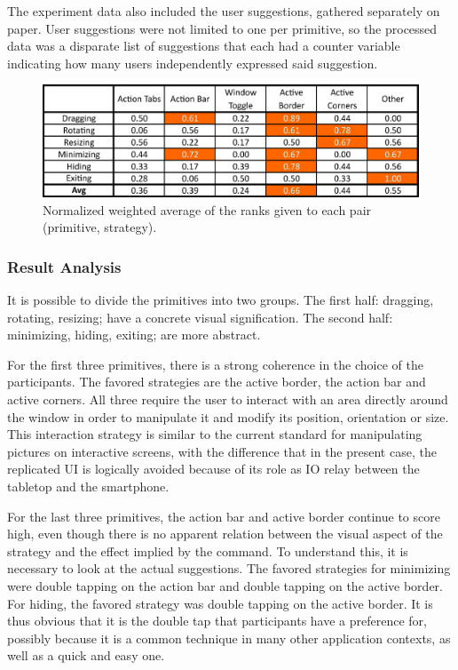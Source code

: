 The experiment data also included the user suggestions, gathered separately on paper.
User suggestions were not limited to one per primitive, so the processed data was a disparate list of suggestions that each had a counter variable indicating how many users independently expressed said suggestion.

\begin{figure}[htb]
  \centering
    \includegraphics[scale=1]{images/resultMatrix}
  \caption{Normalized weighted average of the ranks given to each pair (primitive, strategy).}
  \label{resultMatrix}
\end{figure}


\subsubsection{Result Analysis}

It is possible to divide the primitives into two groups.
The first half: dragging, rotating, resizing; have a concrete visual signification.
The second half: minimizing, hiding, exiting; are more abstract.

For the first three primitives, there is a strong coherence in the choice of the participants.
The favored strategies are the active border, the action bar and active corners.
All three require the user to interact with an area directly around the window in order to manipulate it and modify its position, orientation or size.
This interaction strategy is similar to the current standard for manipulating pictures on interactive screens, with the difference that in the present case, the replicated UI is logically avoided because of its role as IO relay between the tabletop and the smartphone.

For the last three primitives, the action bar and active border continue to score high, even though there is no apparent relation between the visual aspect of the strategy and the effect implied by the command.
To understand this, it is necessary to look at the actual suggestions.
The favored strategies for minimizing were double tapping on the action bar and double tapping on the active border.
For hiding, the favored strategy was double tapping on the active border.
It is thus obvious that it is the double tap that participants have a preference for, possibly because it is a common technique in many other application contexts, as well as a quick and easy one.

